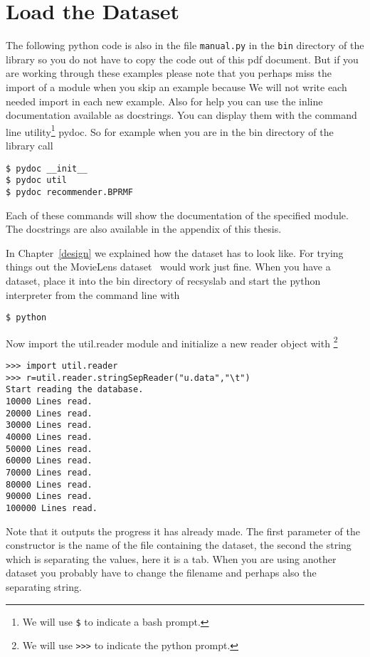 \section{Load the Dataset}
The following python code is also in the file \lstinline!manual.py! in the \lstinline!bin! directory of the library
so you do not have to copy the code out of this pdf document. But if you are working through these examples
please note that you perhaps miss the import of a module when you skip an example because
We will not write each needed import in each new example.
Also for help you can use the inline documentation available as docstrings.
You can display them with the command line utility\footnote{We will use \lstinline!$! to indicate a bash prompt.} pydoc.
So for example when you are in the bin directory of the library call

\begin{lstlisting}
$ pydoc __init__
$ pydoc util 
$ pydoc recommender.BPRMF
\end{lstlisting}
Each of these commands will show the documentation of the specified module.
The docstrings are also available in the appendix of this thesis.


In Chapter~\ref{design} we explained how the dataset has to look like.
For trying things out the MovieLens dataset~\cite{movielensdatasets} would work just fine.
When you have a dataset, place it into the bin directory of recsyslab and start the
python interpreter from the command line with
\begin{lstlisting}
$ python
\end{lstlisting}
Now import the util.reader module and initialize a new reader object with
\footnote{We will use \lstinline!>>>! to indicate the python prompt.}
\begin{lstlisting}[style=python]
>>> import util.reader
>>> r=util.reader.stringSepReader("u.data","\t")
Start reading the database.
10000 Lines read.
20000 Lines read.
30000 Lines read.
40000 Lines read.
50000 Lines read.
60000 Lines read.
70000 Lines read.
80000 Lines read.
90000 Lines read.
100000 Lines read.
\end{lstlisting}
Note that it outputs the progress it has already made.
The first parameter of the constructor is the name of the file containing the dataset,
the second the string which is separating the values, here it is a tab. 
When you are using another dataset you probably have to change the filename and perhaps
also the separating string.

